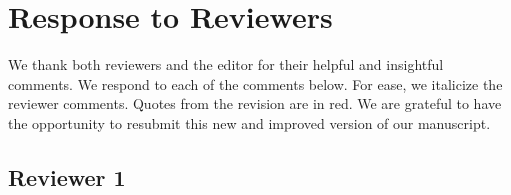 % 
% 
% 
% 
% 
% 
% 


\onecolumn
\setcounter{page}{1}
\section*{Response to Reviewers} %
\label{sec:response_to_reviewers}



We thank both reviewers and the editor for their helpful and insightful comments.  We respond to each of the comments below. For ease, we italicize the reviewer comments.  Quotes from the revision are in red. We are grateful to have the opportunity to resubmit this new and improved version of our manuscript.


\subsection*{Reviewer 1}


